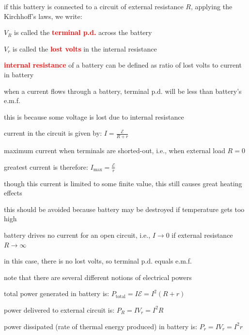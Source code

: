 \documentclass[a4paper,12pt]{book}
\newcommand{\cmt}{}
\newcommand{\keypoint}[1]{\textbf{\textcolor{red}{#1}}}
\newcommand{\tmax}{\text{max}}
\newcommand{\tcbhighmath}[1]{\boxed{#1}}
\newcommand{\keypoint}[1]{\textbf{\textcolor{red}{#1}}}
\newcommand{\cmt}{}
\begin{document}
if this battery is connected to a circuit of external resistance $R$, applying the Kirchhoff's laws, we write:

{
	\centering
	
	\begin{empheq}[box=\tcbhighmath]{equation*}{\mathcal{E} = V_R + V_r = I(R+r)}\end{empheq}
	
}

$V_R$ is called the \keypoint{terminal p.d.} across the battery

$V_r$ is called the \keypoint{lost volts} in the internal resistance

\cmt \keypoint{internal resistance} of a battery can be defined as ratio of lost volts to current in battery

\cmt when a current flows through a battery, terminal p.d. will be less than battery's e.m.f.

this is because some voltage is lost due to internal resistance

\cmt current in the circuit is given by: $I = \frac{\mathcal{E}}{R+r}$

\begin{compactitem}
	\item[--] maximum current when terminals are shorted-out, i.e., when external load $R=0$
	
	greatest current is therefore: $I_\tmax = \frac{\mathcal{E}}{r}$
	
	though this current is limited to some finite value, this still causes great heating effects
	
	this should be avoided because battery may be destroyed if temperature gets too high
	
	\item[--] battery drives no current for an open circuit, i.e., $I \to 0$ if external resistance $R \to \infty$
	
	in this case, there is no lost volts, so terminal p.d. equals e.m.f.
\end{compactitem}

\cmt note that there are several different notions of electrical powers

\begin{compactitem}
	\item[--] total power generated in battery is: $P_\text{total} = I\mathcal{E} = I^2 (R+r)$

	\item[--] power delivered to external circuit is: $P_R = I V_r = I^2 R$

	\item[--] power dissipated (rate of thermal energy produced) in battery is: $P_r = I V_r = I^2 r$
\end{compactitem}
\end{document}
